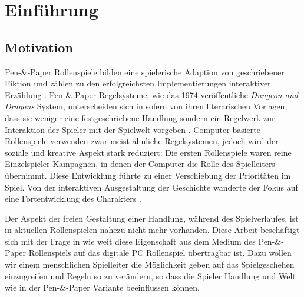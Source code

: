 \chapter{Einführung}


\section{Motivation}
\label{sec:Motivation}

Pen-\&-Paper Rollenspiele bilden eine spielerische Adaption von geschriebener Fiktion und zählen zu den erfolgreichsten Implementierungen interaktiver Erzählung \cite{Tychsen2006}. Pen-\&-Paper Regelsysteme, wie das 1974 veröffentliche \emph{Dungeon and Dragons} System, unterscheiden sich in sofern von ihren literarischen Vorlagen, dass sie weniger eine festgeschriebene Handlung sondern ein Regelwerk zur Interaktion der Spieler mit der Spielwelt vorgeben \cite{Apperley2006}. Computer-basierte Rollenspiele verwenden zwar meist ähnliche Regelsystemen, jedoch wird der soziale und kreative Aspekt stark reduziert: Die ersten Rollenspiele waren reine Einzelspieler Kampagnen, in denen der Computer die Rolle des Spielleiters übernimmt\cite{Apperley2006}. Diese Entwicklung führte zu einer Verschiebung der Prioritäten im Spiel. Von der interaktiven Ausgestaltung der Geschichte wanderte der Fokus auf eine Fortentwicklung des Charakters .

Der Aspekt der freien Gestaltung einer Handlung, während des Spielverlaufes, ist in aktuellen Rollenspielen nahezu nicht mehr vorhanden. Diese Arbeit beschäftigt sich mit der Frage in wie weit diese Eigenschaft aus dem Medium des Pen-\&-Paper Rollenspiels auf das digitale PC Rollenspiel übertragbar ist. Dazu wollen wir einem menschlichen Spielleiter die Möglichkeit geben auf das Spielgeschehen einzugreifen und Regeln so zu verändern, so dass die Spieler Handlung und Welt wie in der Pen-\&-Paper Variante beeinflussen können.

